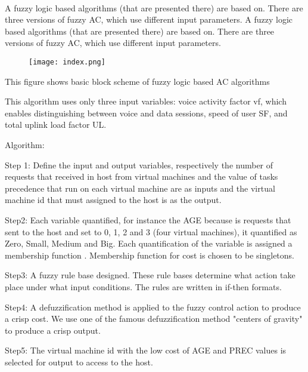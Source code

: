\documentclass[a4paper,12pt]{report}
\begin{document}
{{{{	\paragraph{} A fuzzy logic based algorithms (that are presented
there) are based on. There are three versions of fuzzy
AC, which use different input parameters.
 A fuzzy logic based algorithms (that are presented
there) are based on. There are three versions of fuzzy
AC, which use different input parameters.
\vspace{20}
\begin{figure}[h]
	\begin{center}
		\texttt{[image: index.png]}\\
	\end{center}
\end{figure}
\vspace{70}
\par	This figure shows basic block scheme of fuzzy logic
based AC algorithms
\par This algorithm uses only three input variables: voice activity factor vf, which enables distinguishing between voice and data sessions, speed of user SF, and total uplink load factor UL.
		
\pagebreak
 
		\linespread{1.5}
		
		 Algorithm:
		
	Step 1: Define the input and output variables, respectively the
	number of requests that received in host from virtual
	machines and the value of tasks precedence that run
	on each virtual machine are as inputs and the virtual
	machine id that must assigned to the host is as the
	output.
	
	Step2: Each variable quantified, for instance the AGE
	because is requests that sent to the host and set to 0, 1,
	2 and 3 (four virtual machines), it quantified as Zero,
	Small, Medium and Big. Each quantification of the
	variable is assigned a membership function . Membership function for cost is
	chosen to be singletons.
	
	Step3: A fuzzy rule base designed. These rule bases
	determine what action take place under what input
	conditions. The rules are written in if-then formats.
	
	Step4: A defuzzification method is applied to the fuzzy control
	action to produce a crisp cost. We use one of the
	famous defuzzification method "centers of gravity" to
	produce a crisp output.
	
	Step5: The virtual machine id with the low cost of AGE and
	PREC values is selected for output to access to the host.
		
}}}}
\end{document}
